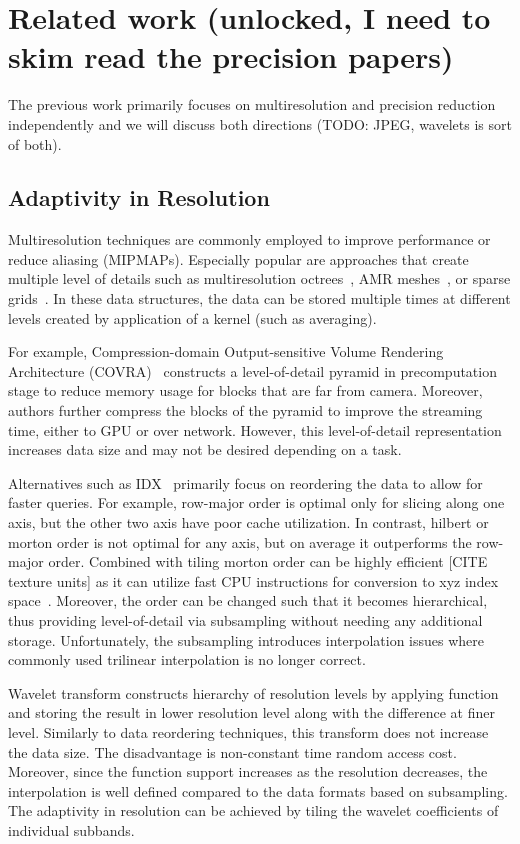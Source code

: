\section{Related work (unlocked, I need to skim read the precision papers)}

The previous work primarily focuses on multiresolution and precision
reduction independently and we will discuss both directions
(TODO: JPEG, wavelets is sort of both).


\subsection{Adaptivity in Resolution}
Multiresolution techniques are commonly employed to improve performance or
reduce aliasing (MIPMAPs). Especially popular are approaches that create
multiple level of details such as multiresolution octrees~\cite{multires_octree1999},
AMR meshes~\cite{amr1989}, or sparse grids~\cite{vdb2013, spgrid2014}. In these data structures,
the data can be stored multiple times at different levels created by application of a kernel
(such as averaging). 

For example, Compression-domain Output-sensitive Volume Rendering Architecture (COVRA)~\cite{covra2012}
constructs a level-of-detail pyramid in precomputation stage to reduce memory usage for blocks that
are far from camera. Moreover, authors further compress the blocks of the pyramid to improve the
streaming time, either to GPU or over network. However, this level-of-detail representation increases data size
and may not be desired depending on a task.

Alternatives such as IDX~\cite{idx2001} primarily focus on reordering the data to allow
for faster queries. For example, row-major order is optimal only for slicing
along one axis, but the other two axis have poor cache utilization. In contrast, hilbert
or morton order is not optimal for any axis, but on average it outperforms the row-major
order. Combined with tiling morton order can be highly efficient [CITE texture units] as
it can utilize fast CPU instructions for conversion to xyz index space~\cite{spgrid2014}.
Moreover, the order can be changed such that it becomes hierarchical, thus providing
level-of-detail via subsampling without needing any additional storage. Unfortunately,
the subsampling introduces interpolation issues where commonly used trilinear interpolation
is no longer correct.

Wavelet transform constructs hierarchy of resolution levels by applying function and storing
the result in lower resolution level along with the difference at finer level. Similarly to
data reordering techniques, this transform does not increase the data size. The disadvantage is non-constant
time random access cost. Moreover, since
the function support increases as the resolution decreases, the interpolation is well defined
compared to the data formats based on subsampling. The adaptivity in resolution can be achieved
by tiling the wavelet coefficients of individual subbands. 

